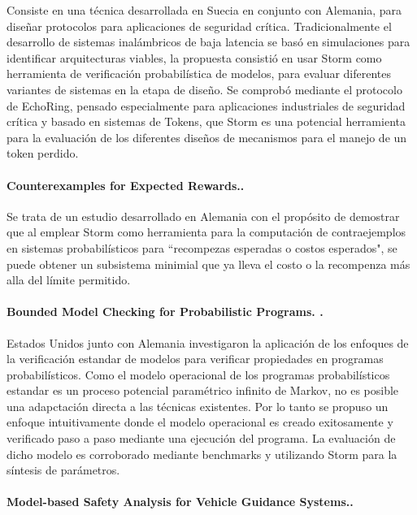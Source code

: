 \documentclass[11pt]{article}
\begin{document}
Consiste en una t\'ecnica desarrollada en Suecia en conjunto con Alemania, para dise\~nar protocolos para aplicaciones de seguridad cr\'itica. Tradicionalmente el desarrollo de sistemas inal\'ambricos de baja latencia se bas\'o en simulaciones para identificar arquitecturas viables, la propuesta consisti\'o en usar Storm como herramienta de verificaci\'on probabil\'istica de modelos, para evaluar diferentes variantes de sistemas en la etapa de dise\~no. Se comprob\'o mediante el protocolo de EchoRing, pensado especialmente para aplicaciones industriales de seguridad cr\'itica y basado en sistemas de Tokens, que Storm es una potencial herramienta para la evaluaci\'on de los diferentes dise\~nos de mecanismos para el manejo de un token perdido.

\paragraph{Counterexamples for Expected Rewards.\cite{Tim}.}

Se trata de un estudio desarrollado en Alemania con el prop\'osito de demostrar que al emplear Storm como herramienta para la computaci\'on de contraejemplos en sistemas probabil\'isticos para ``recompezas esperadas o costos esperados", se puede obtener un subsistema minimial que ya lleva el costo o la recompenza m\'as alla del l\'imite permitido.

\paragraph{Bounded Model Checking for Probabilistic Programs. \cite{Nils}.}

Estados Unidos junto con Alemania investigaron la aplicaci\'on de los enfoques de la verificaci\'on estandar de modelos para verificar propiedades en programas probabil\'isticos. Como el modelo operacional de los programas probabil\'isticos estandar es un proceso potencial param\'etrico infinito de Markov, no es posible una adapctaci\'on directa a las t\'ecnicas existentes. Por lo tanto se propuso un enfoque intuitivamente donde el modelo operacional es creado exitosamente y verificado paso a paso mediante una ejecuci\'on del programa. La evaluaci\'on de dicho modelo es corroborado mediante benchmarks y utilizando Storm para la s\'intesis de par\'ametros.

\paragraph{Model-based Safety Analysis for Vehicle Guidance Systems.\cite{Majdi}.} 
\end{document}
